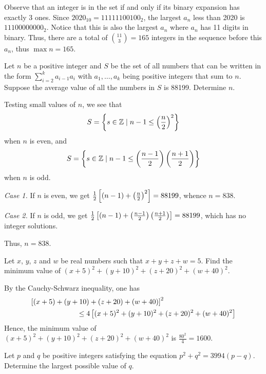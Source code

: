 Observe that an integer is in the set if and only if its binary expansion has exactly 3 ones. Since $2020_{10} = 11111100100_{2}$, the largest $a_n$ less than 2020 is $11100000000_{2}$. Notice that this is also the largest $a_n$ where $a_n$ has 11 digits in binary. Thus, there are a total of $\binom{11}{3} = 165$ integers in the sequence before this $a_n$, thus $\max n = 165$.

\begin{question}[838]\label{A::2020-O-1-23}
    Let $n$ be a positive integer and $S$ be the set of all numbers that can be written in the form $\displaystyle\sum_{i = 2}^k a_{i-1}a_i$ with $a_1, \ldots, a_k$ being positive integers that sum to $n$. Suppose the average value of all the numbers in $S$ is 88199. Determine $n$.
\end{question}

Testing small values of $n$, we see that \[S = \left\lbrace s \in \mathbb{Z} \mid n-1 \leq \left( \frac{n}{2} \right)^2 \right\rbrace\] when $n$ is even, and \[S = \left\lbrace s \in \mathbb{Z} \mid n-1 \leq \left( \frac{n-1}{2} \right)\left( \frac{n+1}{2} \right) \right\rbrace\] when $n$ is odd.

\textit{Case 1.} If $n$ is even, we get $\frac12 \left[ (n-1) + \left( \frac{n}{2} \right)^2 \right] = 88199$, whence $n = 838$.

\textit{Case 2.} If $n$ is odd, we get $\frac12 \left[ (n-1) + \left( \frac{n-1}{2} \right)\left( \frac{n+1}{2} \right) \right] = 88199$, which has no integer solutions.

Thus, $n = 838$.

\begin{question}[1600]\label{A::2020-O-1-24}
    Let $x$, $y$, $z$ and $w$ be real numbers such that $x + y + z + w = 5$. Find the minimum value of $(x + 5)^2 + (y + 10)^2 + (z + 20)^2 + (w + 40)^2$.
\end{question}

By the Cauchy-Schwarz inequality, one has
\begin{align*}
    \bs{(x+5)+(y+10)+(z+20)+(w+40)}^2 \hspace{10em}\\
    \hspace{3em}\leq 4 \bs{(x + 5)^2 + (y + 10)^2 + (z + 20)^2 + (w + 40)^2}
\end{align*}
Hence, the minimum value of $(x + 5)^2 + (y + 10)^2 + (z + 20)^2 + (w + 40)^2$ is $\frac{80^2}4 = 1600$.

\begin{question}[290]\label{A::2020-O-1-25}
    Let $p$ and $q$ be positive integers satisfying the equation $p^2 + q^2 = 3994(p-q)$. Determine the largest possible value of $q$.
\end{question}

